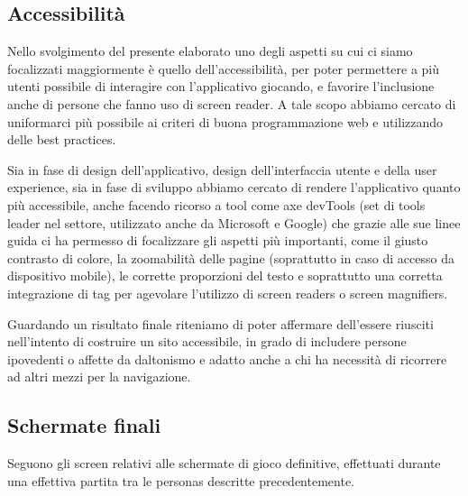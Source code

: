 \subsection{Accessibilità}
Nello svolgimento del presente elaborato uno degli aspetti su cui ci siamo focalizzati maggiormente è quello dell'accessibilità, per poter permettere a più utenti possibile di interagire con l'applicativo giocando, e favorire l'inclusione anche di persone che fanno uso di screen reader. A tale scopo abbiamo cercato di uniformarci più possibile ai criteri di buona programmazione web e utilizzando delle best practices. \newline

\noindent Sia in fase di design dell'applicativo, design dell'interfaccia utente e della user experience, sia in fase di sviluppo abbiamo cercato di rendere l'applicativo quanto più accessibile, anche facendo ricorso a tool come axe devTools (set di tools leader nel settore, utilizzato anche da Microsoft e Google) che grazie alle sue linee guida ci ha permesso di focalizzare gli aspetti più importanti, come il giusto contrasto di colore, la zoomabilità delle pagine (soprattutto in caso di accesso da dispositivo mobile), le corrette proporzioni del testo e soprattutto una corretta integrazione di tag per agevolare l'utilizzo di screen readers o screen magnifiers.\newline

\noindent Guardando un risultato finale riteniamo di poter affermare dell'essere riusciti nell'intento di costruire un sito accessibile, in grado di includere persone ipovedenti o affette da daltonismo e adatto anche a chi ha necessità di ricorrere ad altri mezzi per la navigazione.

\subsection{Schermate finali}
Seguono gli screen relativi alle schermate di gioco definitive, effettuati durante una effettiva partita tra le personas descritte precedentemente.


